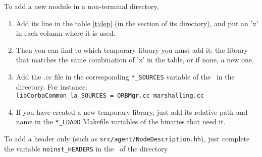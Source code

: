 \noindent
To add a new module in a non-terminal directory,
\begin{enumerate}
\item Add its line in the table \ref{t:dep} (in the section of its
  directory), and put an 'x' in each column where it is used.
\item Then you can find to which temporary library you must add it:
  the library that matches the same combination of 'x' in the table,
  or if none, a new one.
\item Add the \textsf{.cc} file in the corresponding
  \texttt{*\_SOURCES} variable of the \makeam\ in the directory. For
  instance:\\ \texttt{libCorbaCommon\_la\_SOURCES = ORBMgr.cc
  marshalling.cc}
\item If you have created a new temporary library, just add its
  relative path and name in the \texttt{*\_LDADD} Makefile variables
  of the binaries that need it.
\end{enumerate}
To add a header only (such as \texttt{src/agent/NodeDescription.hh}),
just complete the variable \texttt{noinst\_HEADERS} in the \makeam\ of
the directory.  \\

